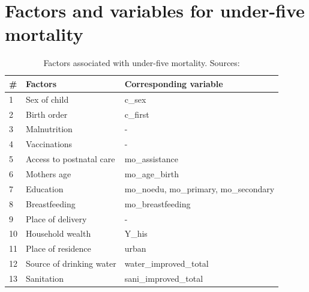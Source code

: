 \documentclass[a4paper, 11pt]{article} %
\begin{document}
\newpage
\section{Factors and variables for under-five mortality} \label{sec:appendix_tab_mortality}
\begin{table}[h!]
\begin{tabular}{@{}lll@{}}
\toprule
\# & \textbf{Factors} & \textbf{Corresponding variable} \\ \midrule
1 & Sex of child & c\_sex  \\
2 & Birth order & c\_first  \\ 
3 & Malnutrition & - \\ 
4 & Vaccinations & - \\ \midrule

5 & Access to postnatal care & mo\_assistance \\
6 & Mothers age & mo\_age\_birth \\
7 & Education & mo\_noedu, mo\_primary, mo\_secondary \\
8 & Breastfeeding & mo\_breastfeeding \\
9 & Place of delivery & - \\ \midrule

10 & Household wealth & Y\_his \\
11 & Place of residence  & urban \\ 
12 & Source of drinking water & water\_improved\_total  \\
13 & Sanitation &  sani\_improved\_total  \\ \bottomrule
\end{tabular}
    \caption{Factors associated with under-five mortality. Sources: \cite{Ettarh2012Mar}\cite{Who2020Sep}} \cite{UNICEF2006}
    \label{table:dead5}
\end{table}


\newpage
\end{document}
